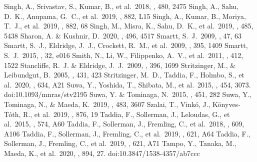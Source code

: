 \documentclass[twocolumn, linenumbers]{aastex62}
\begin{document}
\begin{thebibliography}{99}
 Singh, A., Srivastav, S., Kumar, B., et al.\ 2018, \mnras, 480, 2475
 Singh, A., Sahu, D.~K., Anupama, G.~C., et al.\ 2019, \apjl, 882, L15
 Singh, A., Kumar, B., Moriya, T.~J., et al.\ 2019, \apj, 882, 68
 Singh, M., Misra, K., Sahu, D.~K., et al.\ 2019, \mnras, 485, 5438
 Sharon, A. \& Kushnir, D.\ 2020, \mnras, 496, 4517
 Smartt, S.~J.\ 2009, \araa, 47, 63
 Smartt, S.~J., Eldridge, J.~J., Crockett, R.~M., et al.\ 2009, \mnras, 395, 1409
 Smartt, S.~J.\ 2015, \pasa, 32, e016
 Smith, N., Li, W., Filippenko, A.~V., et al.\ 2011, \mnras, 412, 1522
 Stancliffe, R.~J. \& Eldridge, J.~J.\ 2009, \mnras, 396, 1699
 Stritzinger, M., \& Leibundgut, B.\ 2005, \aap, 431, 423
 Stritzinger, M.~D., Taddia, F., Holmbo, S., et al.\ 2020, \aap, 634, A21
 Suwa, Y., Yoshida, T., Shibata, M., et al.\ 2015, \mnras, 454, 3073. doi:10.1093/mnras/stv2195
 Suwa, Y. \& Tominaga, N.\ 2015, \mnras, 451, 282
 Suwa, Y., Tominaga, N., \& Maeda, K.\ 2019, \mnras, 483, 3607
 Szalai, T., Vink{\'o}, J., K{\"o}nyves-T{\'o}th, R., et al.\ 2019, \apj, 876, 19
 Taddia, F., Sollerman, J., Leloudas, G., et al.\ 2015, \aap, 574, A60
 Taddia, F., Sollerman, J., Fremling, C., et al.\ 2018, \aap, 609, A106
 Taddia, F., Sollerman, J., Fremling, C., et al.\ 2019, \aap, 621, A64
 Taddia, F., Sollerman, J., Fremling, C., et al.\ 2019, \aap, 621, A71
 Tampo, Y., Tanaka, M., Maeda, K., et al.\ 2020, \apj, 894, 27. doi:10.3847/1538-4357/ab7ccc

\end{thebibliography}
\end{document}
